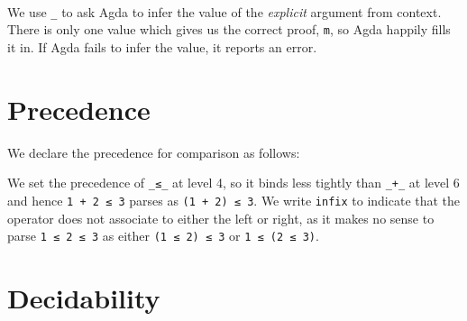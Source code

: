 \begin{fence}
\begin{code}%
\>[0]\AgdaSpace{}%
\AgdaSymbol{:}\AgdaSpace{}%
\AgdaSpace{}%
\AgdaSymbol{\{}\AgdaSpace{}%
\AgdaSymbol{:}\AgdaSpace{}%
\AgdaSymbol{\}}\AgdaSpace{}%
\AgdaSpace{}%
\AgdaSpace{}%
\AgdaOperator{\AgdaPrimitive{+}}\AgdaSpace{}%
\AgdaSpace{}%
\AgdaSpace{}%
\<%
\\
\>[0]\AgdaSpace{}%
\AgdaSymbol{=}\AgdaSpace{}%
\AgdaSpace{}%
\AgdaSymbol{\AgdaUnderscore{}}\<%
\end{code}
\end{fence}

We use \texttt{\_} to ask Agda to infer the value of the \emph{explicit}
argument from context. There is only one value which gives us the
correct proof, \texttt{m}, so Agda happily fills it in. If Agda fails to
infer the value, it reports an error.

\hypertarget{precedence}{%
\section{Precedence}\label{precedence}}

We declare the precedence for comparison as follows:

\begin{fence}
\begin{code}%
\>[0]\AgdaSpace{}%
\AgdaSpace{}%
\<%
\end{code}
\end{fence}

We set the precedence of \texttt{\_≤\_} at level 4, so it binds less
tightly than \texttt{\_+\_} at level 6 and hence \texttt{1\ +\ 2\ ≤\ 3}
parses as \texttt{(1\ +\ 2)\ ≤\ 3}. We write \texttt{infix} to indicate
that the operator does not associate to either the left or right, as it
makes no sense to parse \texttt{1\ ≤\ 2\ ≤\ 3} as either
\texttt{(1\ ≤\ 2)\ ≤\ 3} or \texttt{1\ ≤\ (2\ ≤\ 3)}.

\hypertarget{decidability}{%
\section{Decidability}\label{decidability}}

